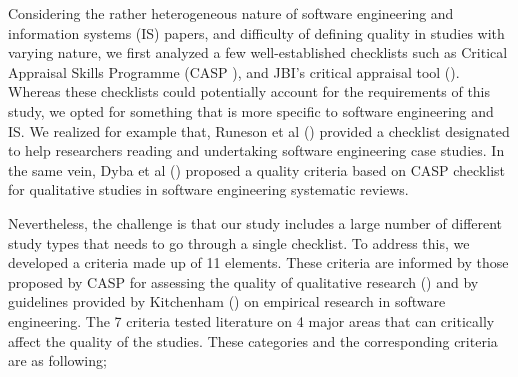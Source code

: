 \documentclass[review]{elsarticle}
\begin{document}
Considering the rather heterogeneous nature of software engineering and information systems (IS) papers, and difficulty of defining quality in studies with varying nature, we first analyzed a few well-established checklists such as Critical Appraisal Skills Programme (CASP \cite{CASP}), and JBI's critical appraisal tool (\cite{JBI}). Whereas these checklists could potentially account for the requirements of this study, we opted for something that is more specific to software engineering and IS. We realized for example that, Runeson et al (\cite{runeson2006we}) provided a checklist designated to help researchers reading and undertaking software engineering case studies. In the same vein, Dyba et al (\cite{dybaa2008empirical}) proposed a quality criteria based on CASP checklist for qualitative studies in software engineering systematic reviews. 

Nevertheless, the challenge is that our study includes a large number of different study types that needs to go through a single checklist. To address this, we developed a criteria made up of 11 elements. These criteria are informed by those proposed by CASP for assessing the quality of qualitative research (\cite{CASP}) and by guidelines provided by Kitchenham (\cite{kitchenham2002preliminary}) on empirical research in software engineering. The 7 criteria tested literature on 4 major areas that can critically affect the quality of the studies. These categories and the corresponding criteria are as following;
\end{document}
